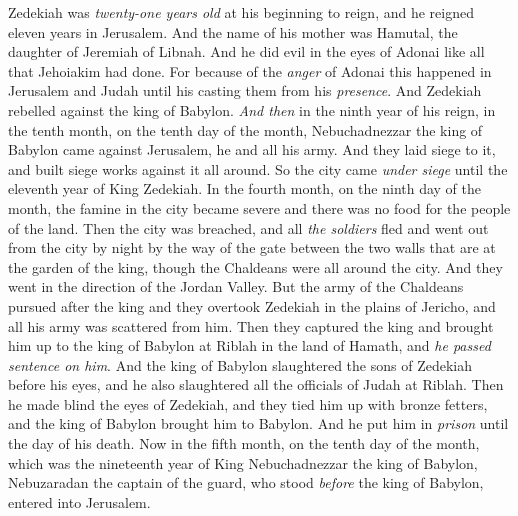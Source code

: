 \begin{biblechapter} %
 Zedekiah was \textit{twenty-one years old} at his beginning to reign, and he reigned eleven years in Jerusalem. And the name of his mother was Hamutal, the daughter of Jeremiah of Libnah.
\verse And he did evil in the eyes of Adonai like all that Jehoiakim had done.
\verse For because of the \textit{anger} of Adonai this happened in Jerusalem and Judah until his casting them from his \textit{presence}. And Zedekiah rebelled against the king of Babylon.
\verse \textit{And then} in the ninth year of his reign, in the tenth month, on the tenth day of the month, Nebuchadnezzar the king of Babylon came against Jerusalem, he and all his army. And they laid siege to it, and built siege works against it all around.
\verse So the city came \textit{under siege} until the eleventh year of King Zedekiah.
\verse In the fourth month, on the ninth day of the month, the famine in the city became severe and there was no food for the people of the land.
\verse Then the city was breached, and all \textit{the soldiers} fled and went out from the city by night by the way of the gate between the two walls that are at the garden of the king, though the Chaldeans were all around the city. And they went in the direction of the Jordan Valley.
\verse But the army of the Chaldeans pursued after the king and they overtook Zedekiah in the plains of Jericho, and all his army was scattered from him.
\verse Then they captured the king and brought him up to the king of Babylon at Riblah in the land of Hamath, and \textit{he passed sentence on him}.
\verse And the king of Babylon slaughtered the sons of Zedekiah before his eyes, and he also slaughtered all the officials of Judah at Riblah.
\verse Then he made blind the eyes of Zedekiah, and they tied him up with bronze fetters, and the king of Babylon brought him to Babylon. And he put him in \textit{prison} until the day of his death.
\verse Now in the fifth month, on the tenth day of the month, which was the nineteenth year of King Nebuchadnezzar the king of Babylon, Nebuzaradan the captain of the guard, who stood \textit{before} the king of Babylon, entered into Jerusalem.

\end{biblechapter}
